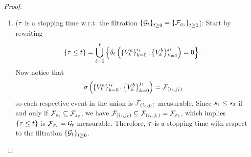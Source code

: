 \begin{proof}
\begin{enumerate}
        \item
        \big($\tau$ is a stopping time w.r.t. the filtration
        \(
            \left\{
                \mathcal{G}_{t}
            \right\}_{t\geq 0}
            =
            \left\{
                \mathcal{F}_{
                    \sigma_{t}
                }
            \right\}_{t\geq 0}
        \)\big):
        Start by rewriting
        \[
            \left\{
                \tau\leq t
            \right\}
            =
            \bigcup_{\ell=0}^t
            \left\{
                \delta_{\ell}\left(
                    \left\{
                        V^a_{k}
                    \right\}_{k=0}^{i_{\ell}}
                    ,
                    \left\{
                        V^b_{k}
                    \right\}_{k=0}^{j_{\ell}}
                \right)
                = 0
            \right\} .
        \]
        Now notice that 
        \[
            \sigma\left(
                \left\{
                    V^a_{k}
                \right\}_{k=0}^{i_{\ell}}
                ,
                \left\{
                    V^b_{k}
                \right\}_{k=0}^{j_{\ell}}
            \right)
            =
            \mathcal{F}_{
                \left(
                    i_{\ell},
                    j_{\ell}
                \right)
            }
        \]
        so each respective event in the union is 
        \(
            \mathcal{F}_{
                \left(
                    i_{\ell},
                    j_{\ell}
                \right)
            }
        \)-measurable. Since $s_{1}\leq s_{2}$ if and only if 
        \(
            \mathcal{F}_{
                s_{1}
            }
            \subseteq
            \mathcal{F}_{
                s_{2}
            }
        \), we have 
        \(
            \mathcal{F}_{
                \left(
                    i_{\ell},
                    j_{\ell}
                \right)
            }
            \subseteq
            \mathcal{F}_{
                \left(
                    i_{t},
                    j_{t}
                \right)
            }
            =
            \mathcal{F}_{
                \sigma_{t}
            }
        \), which implies
        \(
            \left\{
                \tau\leq t
            \right\}
        \)
        is 
        \(
            \mathcal{F}_{
                \sigma_{t}
            }
            =
            \mathcal{G}_{t}
        \)-measurable.
        Therefore, 
        $\tau$ is a stopping time with respect to the filtration
        \(
            \left\{
                \mathcal{G}_{t}
            \right\}_{t\geq 0}
        \).
        

\end{enumerate}
\end{proof}
